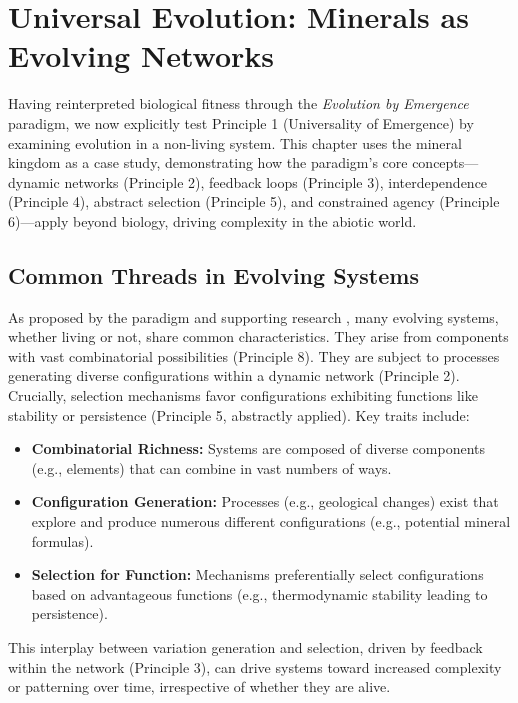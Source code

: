 \chapter{Universal Evolution: Minerals as Evolving Networks} %
\label{ch:UniversalEvolution}

Having reinterpreted biological fitness through the \emph{Evolution by Emergence} paradigm, we now explicitly test Principle 1 (Universality of Emergence) by examining evolution in a non-living system. This chapter uses the mineral kingdom as a case study, demonstrating how the paradigm's core concepts—dynamic networks (Principle 2), feedback loops (Principle 3), interdependence (Principle 4), abstract selection (Principle 5), and constrained agency (Principle 6)—apply beyond biology, driving complexity in the abiotic world. %

\section*{Common Threads in Evolving Systems}

As proposed by the paradigm and supporting research \cite{WongEtAl2023}, many evolving systems, whether living or not, share common characteristics. They arise from components with vast combinatorial possibilities (Principle 8). They are subject to processes generating diverse configurations within a dynamic network (Principle 2). Crucially, selection mechanisms favor configurations exhibiting functions like stability or persistence (Principle 5, abstractly applied). Key traits include:
\begin{itemize}
    \item \textbf{Combinatorial Richness:} Systems are composed of diverse components (e.g., elements) that can combine in vast numbers of ways.
    \item \textbf{Configuration Generation:} Processes (e.g., geological changes) exist that explore and produce numerous different configurations (e.g., potential mineral formulas).
    \item \textbf{Selection for Function:} Mechanisms preferentially select configurations based on advantageous functions (e.g., thermodynamic stability leading to persistence).
\end{itemize}
This interplay between variation generation and selection, driven by feedback within the network (Principle 3), can drive systems toward increased complexity or patterning over time, irrespective of whether they are alive. %

